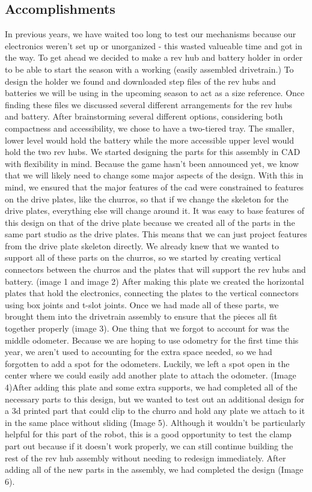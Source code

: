 \subsection*{Accomplishments}
 In previous years, we have waited too long to test our mechanisms because our electronics weren’t set up or unorganized - this wasted valueable time and got in the way. To get ahead we decided to make a rev hub and battery holder in order to be able to start the season with a working (easily assembled drivetrain.)
To design the holder we found and downloaded step files of the rev hubs and batteries we will be using in the upcoming season to act as a size reference. Once finding these files we discussed several different arrangements for the rev hubs and battery. After brainstorming several different options, considering both compactness and accessibility, we chose to have a two-tiered tray. The smaller, lower level would hold the battery while the more accessible upper level would hold the two rev hubs.
We started designing the parts for this assembly in CAD with flexibility in mind. Because the game hasn’t been announced yet, we know that we will likely need to change some major aspects of the design. With this in mind, we ensured that the major features of the cad were constrained to features on the drive plates, like the churros, so that if we change the skeleton for the drive plates, everything else will change around it. It was easy to base features of this design on that of the drive plate because we created all of the parts in the same part studio as the drive plates. This means that we can just project features from the drive plate skeleton directly. We already knew that we wanted to support all of these parts on the churros, so we started by creating vertical connectors between the churros and the plates that will support the rev hubs and battery. (image 1 and image 2) After making this plate we created the horizontal plates that hold the electronics, connecting the plates to the vertical connectors using box joints and t-slot joints.
Once we had made all of these parts, we brought them into the drivetrain assembly to ensure that the pieces all fit together properly (image 3). One thing that we forgot to account for was the middle odometer. Because we are hoping to use odometry for the first time this year, we aren’t used to accounting for the extra space needed, so we had forgotten to add a spot for the odometers. Luckily, we left a spot open in the center where we could easily add another plate to attach the odometer. (Image 4)After adding this plate and some extra supports, we had completed all of the necessary parts to this design, but we wanted to test out an additional design for a 3d printed part that could clip to the churro and hold any plate we attach to it in the same place without sliding (Image 5). Although it wouldn’t be particularly helpful for this part of the robot, this is a good opportunity to test the clamp part out because if it doesn’t work properly, we can still continue building the rest of the rev hub assembly without needing to redesign immediately. After adding all of the new parts in the assembly, we had completed the design (Image 6).

